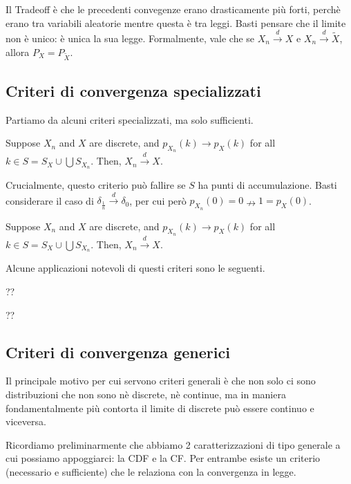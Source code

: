 \begin{my_remark}
	Il Tradeoff è che le precedenti convegenze erano drasticamente più forti, perchè erano tra variabili aleatorie mentre questa è tra leggi. Basti pensare che il limite non è unico: è unica la sua legge. Formalmente, vale che se $X_n \xrightarrow{d} X$ e $X_n \xrightarrow{d} \tilde{X}$, allora $P_X = P_{\tilde{X}}$.
\end{my_remark}

\subsection{Criteri di convergenza specializzati}

Partiamo da alcuni criteri specializzati, ma solo sufficienti.

\begin{my_theorem}
	Suppose $X_n$ and $X$ are discrete, and $p_{X_n}(k) \to p_X(k)$ for all $k \in S = S_X \cup \bigcup S_{X_n}$. Then, $X_n \xrightarrow{d} X$.
\end{my_theorem}

Crucialmente, questo criterio può fallire se $S$ ha punti di accumulazione. Basti considerare il caso di $\delta_\frac{1}{n} \xrightarrow{d} \delta_0$, per cui però $p_{X_n}(0)=0 \nrightarrow 1=p_X(0)$.

\begin{my_theorem}
	Suppose $X_n$ and $X$ are discrete, and $p_{X_n}(k) \to p_X(k)$ for all $k \in S = S_X \cup \bigcup S_{X_n}$. Then, $X_n \xrightarrow{d} X$.
\end{my_theorem}

Alcune applicazioni notevoli di questi criteri sono le seguenti.

?? %

?? %

\subsection{Criteri di convergenza generici}

Il principale motivo per cui servono criteri generali è che non solo ci sono distribuzioni che non sono nè discrete, nè continue, ma in maniera fondamentalmente più contorta il limite di discrete può essere continuo e viceversa. 

Ricordiamo preliminarmente che abbiamo 2 caratterizzazioni di tipo generale a cui possiamo appoggiarci: la CDF e la CF. Per entrambe esiste un criterio (necessario e sufficiente) che le relaziona con la convergenza in legge.

